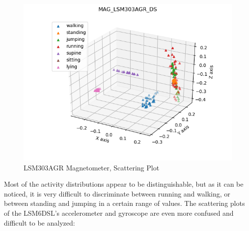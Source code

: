 \begin{figure}[H]
	\hfill\includegraphics[scale=0.8]{figures/scatter3d_MAG_LSM303AGR_DS.png}\hspace*{\fill}
	\caption{LSM303AGR Magnetometer, Scattering Plot }\label{fig:8}
	\centering
\end{figure}
Most of the activity distributions appear to be distinguishable, but as it can be noticed, it is very difficult to discriminate between running and walking, or between standing and jumping in a certain range of values. The scattering plots of the LSM6DSL's accelerometer and gyroscope are even more confused and difficult to be analyzed:
